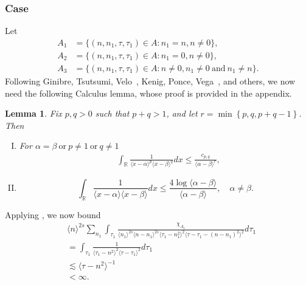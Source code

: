 \documentclass[12pt,reqno]{amsart}
\numberwithin{equation}{section}  %
\renewcommand{\cref}{\Cref}
\newcommand{\rr}{\mathbb{R}}
\newtheorem{lemma}[theorem]{Lemma}
\begin{document}
 \subsubsection{Case \cref{it-6}} 
\label{ssec:case-it-6}
Let 
%
%
\begin{align*}
A_1&=\{(n, n_1, \tau, \tau_1)\in A: n_1 = n,  n \neq 0 \},\\
A_2&=\{(n, n_1, \tau, \tau_1)\in A: n_1=0, n \neq 0 \},\\
A_3&=\{(n, n_1, \tau, \tau_1)\in A: n \neq 0, n_1 \neq 0 \ \text{and} \ n_1 \neq n \}.
\end{align*} 
%
%
%
Following Ginibre, Tsutsumi, Velo~\cite{Ginibre:1997fk}, Kenig, Ponce, Vega~\cite{Kenig:1996aa}, and others,
we now need the following Calculus lemma, whose proof is provided in the
appendix.
%
%
%
%
%
%
%
\begin{lemma}
	\label{lem:calc}
 Fix $p, q > 0$ such that $p +q >1$, and let $r =\min\left\{p, q, p+q-1
 \right\}$. Then 
 \begin{enumerate}[(I)]
   \item
For $\alpha=\beta \ \text{or} \ p \neq 1 \ \text{or} \ q \neq 1$
 \begin{equation*}
\begin{split}
  & \int_{\rr} \frac{1}{\langle x - \alpha \rangle ^{p} \langle x -
  \beta \rangle
  ^{q}} d x
  \le \frac{c_{p,q}}{\langle \alpha - \beta \rangle ^{r}}, 
  \end{split}
\end{equation*}
  \item
    \begin{equation*}
  \int_{\rr} \frac{1}{\langle x - \alpha \rangle  \langle x - \beta
  \rangle} d x
  \le  \frac{4 \log \langle \alpha - \beta \rangle}{\langle \alpha - \beta
  \rangle}, \quad \alpha \neq \beta.
\end{equation*}
\end{enumerate}
\end{lemma}
%
%
%
%
%
%
Applying \cref{lem:calc}, we now bound 
\begin{equation*}
  \begin{split}
    & \langle n
    \rangle ^{2s}
    \sum_{n_{1}} \int_{\tau_{1}} \frac{\chi_{A_{1}}}{\langle n_{1} \rangle ^{2s} \langle n-n_{1} \rangle ^{2s} 
    \langle \tau_{1} - n_{1}^{2} \rangle^{2} \langle  \tau - \tau_{1} -
    (n - n_{1})^{2} \rangle^{2}}
    d \tau_1 
    \\
    & = 
    \int_{\tau_{1}} \frac{1}{\langle \tau_{1} -
  n^{2} \rangle^{2} \langle
  \tau - \tau_{1}\rangle^{2}}d \tau_{1}
  \\
  & \lesssim 
  \langle \tau - n^{2} \rangle ^{-1} 
  \\
  & < \infty.
\end{split}
\end{equation*}
\end{document}
